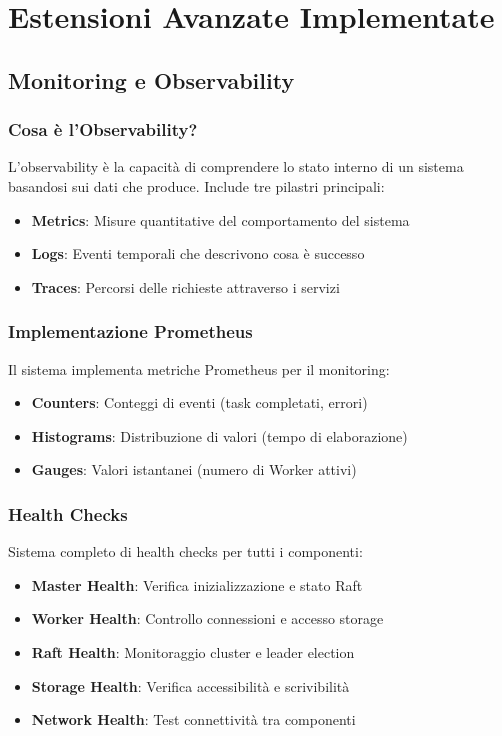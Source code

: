 \documentclass[12pt,a4paper]{article}
\begin{document}
\section{Estensioni Avanzate Implementate}

\subsection{Monitoring e Observability}

\subsubsection{Cosa è l'Observability?}

L'observability è la capacità di comprendere lo stato interno di un sistema basandosi sui dati che produce. Include tre pilastri principali:

\begin{itemize}
\item \textbf{Metrics}: Misure quantitative del comportamento del sistema
\item \textbf{Logs}: Eventi temporali che descrivono cosa è successo
\item \textbf{Traces}: Percorsi delle richieste attraverso i servizi
\end{itemize}

\subsubsection{Implementazione Prometheus}

Il sistema implementa metriche Prometheus per il monitoring:

\begin{itemize}
\item \textbf{Counters}: Conteggi di eventi (task completati, errori)
\item \textbf{Histograms}: Distribuzione di valori (tempo di elaborazione)
\item \textbf{Gauges}: Valori istantanei (numero di Worker attivi)
\end{itemize}

\subsubsection{Health Checks}

Sistema completo di health checks per tutti i componenti:

\begin{itemize}
\item \textbf{Master Health}: Verifica inizializzazione e stato Raft
\item \textbf{Worker Health}: Controllo connessioni e accesso storage
\item \textbf{Raft Health}: Monitoraggio cluster e leader election
\item \textbf{Storage Health}: Verifica accessibilità e scrivibilità
\item \textbf{Network Health}: Test connettività tra componenti
\end{itemize}
\end{document}
